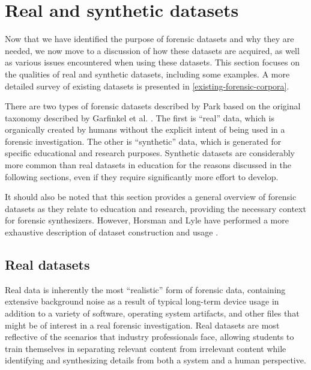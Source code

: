 \documentclass[letterpaper,12pt]{report}
\begin{document}
\section{Real and synthetic
datasets}\label{real-and-synthetic-datasets}

Now that we have identified the purpose of forensic datasets and why
they are needed, we now move to a discussion of how these datasets are
acquired, as well as various issues encountered when using these
datasets. This section focuses on the qualities of real and synthetic
datasets, including some examples. A more detailed survey of existing
datasets is presented in \autoref{existing-forensic-corpora}.

There are two types of forensic datasets described by Park
\cite{parkTREDEVMPOPCultivating2018} based on the original taxonomy
described by Garfinkel et al.
\cite{garfinkelBringingScienceDigital2009}. The first is ``real''
data, which is organically created by humans without the explicit intent
of being used in a forensic investigation. The other is ``synthetic''
data, which is generated for specific educational and research purposes.
Synthetic datasets are considerably more common than real datasets in
education for the reasons discussed in the following sections, even if
they require significantly more effort to develop.

It should also be noted that this section provides a general overview of
forensic datasets as they relate to education and research, providing
the necessary context for forensic synthesizers. However, Horsman and
Lyle have performed a more exhaustive description of dataset
construction and usage
\cite{horsmanDatasetConstructionChallenges2021}.

\subsection{Real datasets}\label{real-datasets}

Real data is inherently the most ``realistic'' form of forensic data,
containing extensive background noise as a result of typical long-term
device usage in addition to a variety of software, operating system
artifacts, and other files that might be of interest in a real forensic
investigation. Real datasets are most reflective of the scenarios that
industry professionals face, allowing students to train themselves in
separating relevant content from irrelevant content while identifying
and synthesizing details from both a system and a human perspective.
\end{document}
